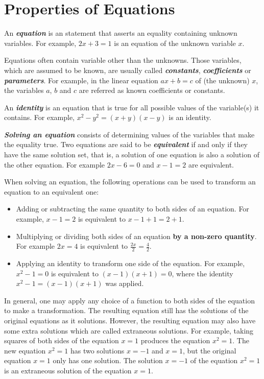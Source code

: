 \documentclass[en,12pt]{elegantbook}
\let\BeginKnitrBlock\begin \let\EndKnitrBlock\end
\begin{document}
\hypertarget{properties-of-equations}{%
\section{Properties of Equations}\label{properties-of-equations}}

An \textbf{\emph{equation}} is an statement that asserts an equality containing unknown variables. For example, \(2x+3=1\) is an equation of the unknown variable \(x\).

Equations often contain variable other than the unknowns. Those variables, which are assumed to be known, are usually called \textbf{\emph{constants}}, \textbf{\emph{coefficients}} or \textbf{\emph{parameters}}. For example, in the linear equation \(ax+b=c\) of (the unknown) \(x\), the variables \(a\), \(b\) and \(c\) are referred as known coefficients or constants.

An \textbf{\emph{identity}} is an equation that is true for all possible values of the variable(s) it contains. For example, \(x^2-y^2=(x+y)(x-y)\) is an identity.

\textbf{\emph{Solving an equation}} consists of determining values of the variables that make the equality true. Two equations are said to be \textbf{\emph{equivalent}} if and only if they have the same solution set, that is, a solution of one equation is also a solution of the other equation. For example \(2x-6=0\) and \(x-1=2\) are equivalent.

\BeginKnitrBlock{rmdnote}
When solving an equation, the following operations can be used to transform an equation to an equivalent one:

\begin{itemize}
\item
  Adding or subtracting the same quantity to both sides of an equation. For example, \(x-1=2\) is equivalent to \(x-1+1=2+1\).
\item
  Multiplying or dividing both sides of an equation \textbf{by a non-zero quantity}. For example \(2x=4\) is equivalent to \(\frac{2x}{2}=\frac{4}{2}\).
\item
  Applying an identity to transform one side of the equation. For example, \(x^2-1=0\) is equivalent to \((x-1)(x+1)=0\), where the identity \(x^2-1=(x-1)(x+1)\) was applied.
\end{itemize}
\EndKnitrBlock{rmdnote}

\BeginKnitrBlock{rmdnote}
In general, one may apply any choice of a function to both sides of the equation to make a transformation. The resulting equation still has the solutions of the original equations as it solutions. However, the resulting equation may also have some extra solutions which are called extraneous solutions. For example, taking squares of both sides of the equation \(x=1\) produces the equation \(x^2=1\). The new equation \(x^2=1\) has two solutions \(x=-1\) and \(x=1\), but the original equation \(x=1\) only has one solution. The solution \(x=-1\) of the equation \(x^2=1\) is an extraneous solution of the equation \(x=1\).
\EndKnitrBlock{rmdnote}
\end{document}
